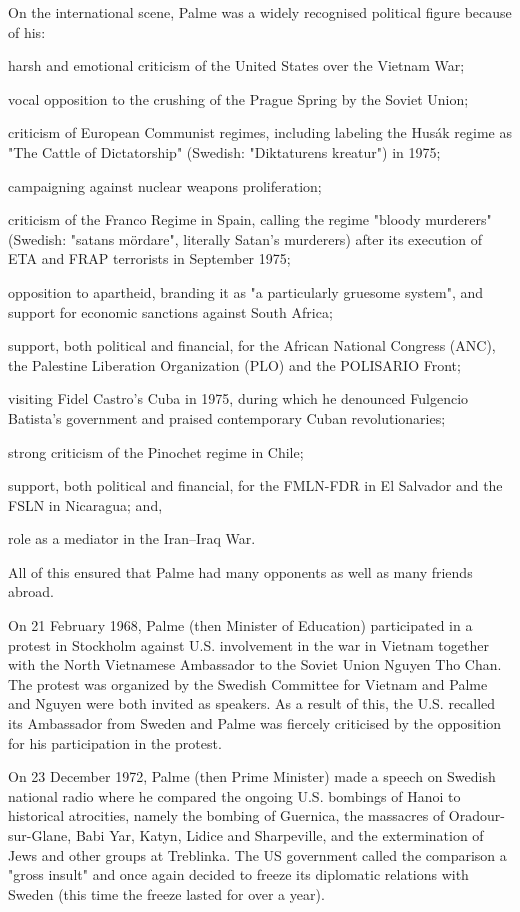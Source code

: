 On the international scene, Palme was a widely recognised political
figure because of his:

harsh and emotional criticism of the United States over the Vietnam War;

vocal opposition to the crushing of the Prague Spring by the Soviet
Union;

criticism of European Communist regimes, including labeling the Husák
regime as "The Cattle of Dictatorship" (Swedish: "Diktaturens kreatur")
in 1975;

campaigning against nuclear weapons proliferation;

criticism of the Franco Regime in Spain, calling the regime "bloody
murderers" (Swedish: "satans mördare", literally Satan's murderers)
after its execution of ETA and FRAP terrorists in September 1975;

opposition to apartheid, branding it as "a particularly gruesome
system", and support for economic sanctions against South Africa;

support, both political and financial, for the African National Congress
(ANC), the Palestine Liberation Organization (PLO) and the POLISARIO
Front;

visiting Fidel Castro's Cuba in 1975, during which he denounced
Fulgencio Batista's government and praised contemporary Cuban
revolutionaries;

strong criticism of the Pinochet regime in Chile;

support, both political and financial, for the FMLN-FDR in El Salvador
and the FSLN in Nicaragua; and,

role as a mediator in the Iran--Iraq War.

All of this ensured that Palme had many opponents as well as many
friends abroad.

On 21 February 1968, Palme (then Minister of Education) participated in
a protest in Stockholm against U.S. involvement in the war in Vietnam
together with the North Vietnamese Ambassador to the Soviet Union Nguyen
Tho Chan. The protest was organized by the Swedish Committee for Vietnam
and Palme and Nguyen were both invited as speakers. As a result of this,
the U.S. recalled its Ambassador from Sweden and Palme was fiercely
criticised by the opposition for his participation in the protest.

On 23 December 1972, Palme (then Prime Minister) made a speech on
Swedish national radio where he compared the ongoing U.S. bombings of
Hanoi to historical atrocities, namely the bombing of Guernica, the
massacres of Oradour-sur-Glane, Babi Yar, Katyn, Lidice and Sharpeville,
and the extermination of Jews and other groups at Treblinka. The US
government called the comparison a "gross insult" and once again decided
to freeze its diplomatic relations with Sweden (this time the freeze
lasted for over a year).

